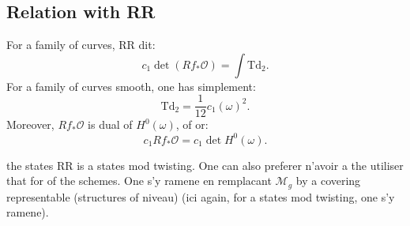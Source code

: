 \documentclass[11pt,a4paper]{article}
\theoremstyle{plain}
\theoremstyle{definition}
\newcommand{\cO}{\mathcal{O}}
\begin{document}
\subsection{Relation with RR}
For a family of curves, RR dit:
\begin{equation}
c_1 \det(Rf_* \cO) = \int \mathrm{Td}_2.
\end{equation}
For a family of curves smooth, one has simplement:
\begin{equation}
\mathrm{Td}_2 = \frac{1}{12} c_1(\omega)^2.
\end{equation}
Moreover, $Rf_* \cO$ is dual of $H^0(\omega)$, of or:
\begin{equation}
c_1 Rf_* \cO = c_1 \det H^0(\omega).
\end{equation}

the states RR is a states mod twisting. One can also preferer n'avoir a the utiliser that for of the schemes. One s'y ramene en remplacant $\mathcal{M}_g$ by a covering representable (structures of niveau) (ici again, for a states mod twisting, one s'y ramene).
\end{document}
